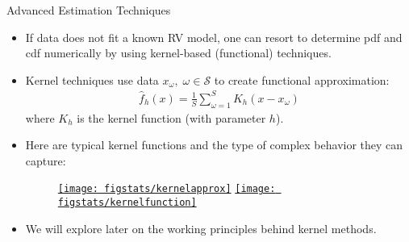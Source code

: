 \documentclass[handout,9pt]{beamer}
\begin{document}
%
\begin{frame}{Advanced Estimation Techniques}

\begin{itemize}
\setlength{\itemsep}{10pt}
\item If data does not fit a known RV model, one can resort to determine pdf and cdf numerically by using kernel-based (functional) techniques. 

\item Kernel techniques use data $x_\omega,\; \omega \in \mathcal{S}$ to create functional approximation:
\begin{align*}
\hat{f}_h(x) = \frac{1}{S}\sum_{\omega=1}^S K_h (x - x_\omega) 
\end{align*}
where $K_h$ is the kernel function (with parameter $h$). 
\item Here are typical kernel functions and the type of complex behavior they can capture:
\begin{figure}[!htb]
    \centering
	\href{https://en.wikipedia.org/wiki/Kernel_(statistics)}{\texttt{[image: figstats/kernelapprox]}}
	\href{https://en.wikipedia.org/wiki/Kernel_(statistics)}{\texttt{[image: figstats/kernelfunction]}}
\end{figure}
\item We will explore later on the working principles behind kernel methods. 

\end{itemize}


\end{frame}
\end{document}

